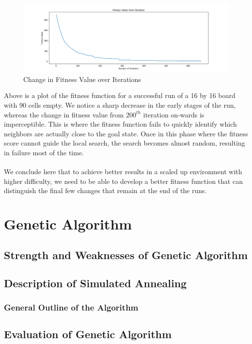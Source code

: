 \documentclass[12pt, a4paper]{article}
\begin{document}
			\begin{figure}[h]
				\begin{center} 
					\includegraphics[width=7in]{16_100_iteration.png}
					\caption{Change in Fitness Value over Iterations} 
				\end{center} 
			\end{figure}
			Above is a plot of the fitness function for a successful run of a 16 by 16 board with 90 cells empty. We notice a sharp decrease in the early stages of the run, whereas the change in fitness value from $200^{th}$ iteration on-wards is imperceptible. This is where the fitness function fails to quickly identify which neighbors are actually close to the goal state. Once in this phase where the fitness score cannot guide the local search, the search becomes almost random, resulting in failure most of the time.\\\\
			We conclude here that to achieve better results in a scaled up environment with higher difficulty, we need to be able to develop a better fitness function that can distinguish the final few changes that remain at the end of the runs.
	\section{Genetic Algorithm}
		\subsection{Strength and Weaknesses of Genetic Algorithm}
		\subsection{Description of Simulated Annealing}
			\subsubsection{General Outline of the Algorithm}
		\subsection{Evaluation of Genetic Algorithm}
\end{document}
